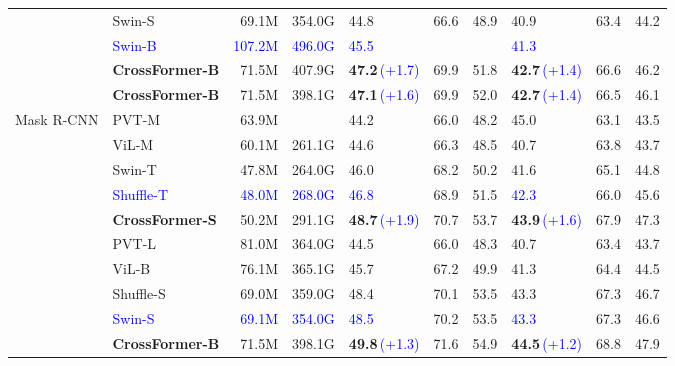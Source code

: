 \documentclass{article} \usepackage{iclr2022_conference,times}
\begin{document}
\begin{table}[]
{\begin{tabular}{c|l|rr|lll|lll}
            & Swin-S & 69.1M & 354.0G & 44.8 & 66.6 & 48.9 & 40.9 & 63.4 & 44.2 \\
            & \textcolor{blue}{Swin-B} & \textcolor{blue}{107.2M} & \textcolor{blue}{496.0G} & \textcolor{blue}{45.5} &  &  & \textcolor{blue}{41.3} &  &  \\
            & \textbf{CrossFormer-B} & 71.5M & 407.9G & \textbf{47.2}\,\textcolor{blue}{(+1.7)} & 69.9 & 51.8 & \textbf{42.7}\,\textcolor{blue}{(+1.4)} & 66.6 & 46.2 \\
            & \textbf{CrossFormer-B} & 71.5M & 398.1G & \textbf{47.1}\,\textcolor{blue}{(+1.6)} & 69.9 & 52.0 & \textbf{42.7}\,\textcolor{blue}{(+1.4)} & 66.5 & 46.1 \\
            
            \midrule
            
            \multirow{10}{*}{Mask R-CNN} & PVT-M & 63.9M &  & 44.2 & 66.0 & 48.2 & 45.0 & 63.1 & 43.5 \\
            \multirow{10}{*}{ schedule} & ViL-M & 60.1M & 261.1G & 44.6 & 66.3 & 48.5 & 40.7 & 63.8 & 43.7 \\
            & Swin-T & 47.8M & 264.0G & 46.0 & 68.2 & 50.2 & 41.6 & 65.1 & 44.8 \\
            & \textcolor{blue}{Shuffle-T} & \textcolor{blue}{48.0M} & \textcolor{blue}{268.0G} & \textcolor{blue}{46.8} & 68.9 & 51.5 & \textcolor{blue}{42.3} & 66.0 & 45.6 \\
            & \textbf{CrossFormer-S}& 50.2M & 291.1G & \textbf{48.7}\,\textcolor{blue}{(+1.9)} & 70.7 & 53.7 & \textbf{43.9}\,\textcolor{blue}{(+1.6)} & 67.9 & 47.3 \\
            \cmidrule{2-10}
            & PVT-L & 81.0M & 364.0G & 44.5 & 66.0 & 48.3 & 40.7 & 63.4 & 43.7  \\
            & ViL-B & 76.1M & 365.1G & 45.7 & 67.2 & 49.9 & 41.3 & 64.4 & 44.5 \\
            & Shuffle-S & 69.0M & 359.0G & 48.4 & 70.1 & 53.5 & 43.3 & 67.3 & 46.7 \\
            & \textcolor{blue}{Swin-S} & \textcolor{blue}{69.1M} & \textcolor{blue}{354.0G} & \textcolor{blue}{48.5} & 70.2 & 53.5 & \textcolor{blue}{43.3} & 67.3 & 46.6 \\
            & \textbf{CrossFormer-B} & 71.5M & 398.1G & \textbf{49.8}\,\textcolor{blue}{(+1.3)} & 71.6 & 54.9 & \textbf{44.5}\,\textcolor{blue}{(+1.2)} & 68.8 & 47.9 \\
            
            \bottomrule
    \end{tabular}}
    \vspace{-2mm}
    \label{tab:detection-2}
\end{table}
\end{document}
